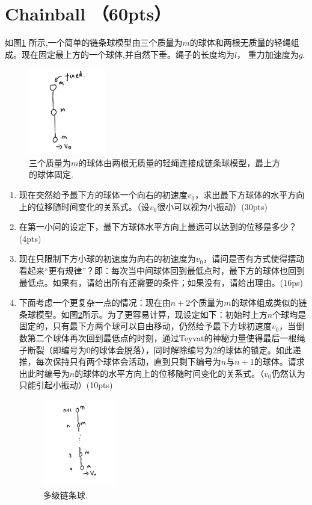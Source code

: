 \section{Chainball （60pts）}
如图\ref{fig:chainball} 所示,一个简单的链条球模型由三个质量为$m$的球体和两根无质量的轻绳组成。现在固定最上方的一个球体,并自然下垂。绳子的长度均为\(l\)， 重力加速度为\(g\).

\begin{figure}[htbp]
	\centering
	\includegraphics[width=0.3\textwidth]{chainball}
	\caption{三个质量为$m$的球体由两根无质量的轻绳连接成链条球模型，最上方的球体固定.}
	\label{fig:chainball}
\end{figure}

\begin{enumerate}
	\item 现在突然给予最下方的球体一个向右的初速度$v_0$，求出最下方球体的水平方向上的位移随时间变化的关系式。（设\(v_{0}\)很小可以视为小振动）(30pts)
	\item 在第一小问的设定下，最下方球体水平方向上最远可以达到的位移是多少？(4pts)
	\item 现在只限制下方小球的初速度为向右的初速度为\(v_0\)，请问是否有方式使得摆动看起来“更有规律”？即：每次当中间球体回到最低点时，最下方的球体也回到最低点。如果有，请给出所有还需要的条件；如果没有，请给出理由。(16ps)
	\item 下面考虑一个更复杂一点的情况：现在由\(n+2\)个质量为\(m\)的球体组成类似的链条球模型。如图\ref{fig:chainball2}所示。为了更容易计算，现设定如下：初始时上方\(n\)个球均是固定的，只有最下方两个球可以自由移动，仍然给予最下方球初速度\(v_{0}\)，当倒数第二个球体再次回到最低点的时刻，通过Teyvat的神秘力量使得最后一根绳子断裂（即编号为0的球体会脱落），同时解除编号为2的球体的锁定。如此递推，每次保持只有两个球体会活动，直到只剩下编号为\(n\)与\(n+1\)的球体。请求出此时编号为\(n\)的球体的水平方向上的位移随时间变化的关系式。（\(v_{0}\)仍然认为只能引起小振动）(10pts)
	\begin{figure}[htbp]
	\centering
	\includegraphics[width=0.3\textwidth]{chainball2}
	\caption{多级链条球.}
	\label{fig:chainball2}
 \end{figure}
\end{enumerate}

